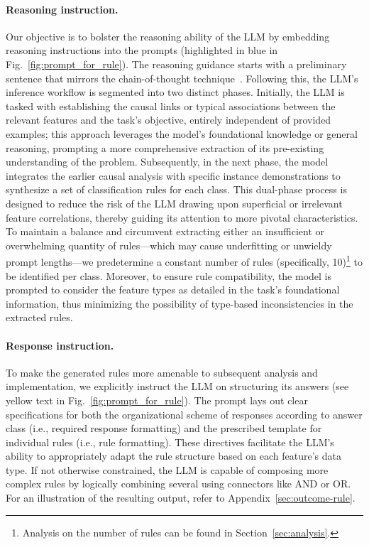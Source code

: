 \paragraph{Reasoning instruction.} Our objective is to bolster the reasoning ability of the LLM by embedding reasoning instructions into the prompts (highlighted in blue in Fig.~\ref{fig:prompt_for_rule}). The reasoning guidance starts with a preliminary sentence that mirrors the chain-of-thought technique~\cite{wei2022chain}. Following this, the LLM's inference workflow is segmented into two distinct phases. Initially, the LLM is tasked with establishing the causal links or typical associations between the relevant features and the task's objective, entirely independent of provided examples; this approach leverages the model's foundational knowledge or general reasoning, prompting a more comprehensive extraction of its pre-existing understanding of the problem. Subsequently, in the next phase, the model integrates the earlier causal analysis with specific instance demonstrations to synthesize a set of classification rules for each class. This dual-phase process is designed to reduce the risk of the LLM drawing upon superficial or irrelevant feature correlations, thereby guiding its attention to more pivotal characteristics. To maintain a balance and circumvent extracting either an insufficient or overwhelming quantity of rules—which may cause underfitting or unwieldy prompt lengths—we predetermine a constant number of rules (specifically, 10)\footnote{Analysis on the number of rules can be found in Section~\ref{sec:analysis}.} to be identified per class. Moreover, to ensure rule compatibility, the model is prompted to consider the feature types as detailed in the task's foundational information, thus minimizing the possibility of type-based inconsistencies in the extracted rules.

\vspace*{-0.12in}
\paragraph{Response instruction.} To make the generated rules more amenable to subsequent analysis and implementation, we explicitly instruct the LLM on structuring its answers (see yellow text in Fig.~\ref{fig:prompt_for_rule}). The prompt lays out clear specifications for both the organizational scheme of responses according to answer class (i.e., required response formatting) and the prescribed template for individual rules (i.e., rule formatting). These directives facilitate the LLM's ability to appropriately adapt the rule structure based on each feature's data type. If not otherwise constrained, the LLM is capable of composing more complex rules by logically combining several using connectors like AND or OR. For an illustration of the resulting output, refer to Appendix~\ref{sec:outcome-rule}.

